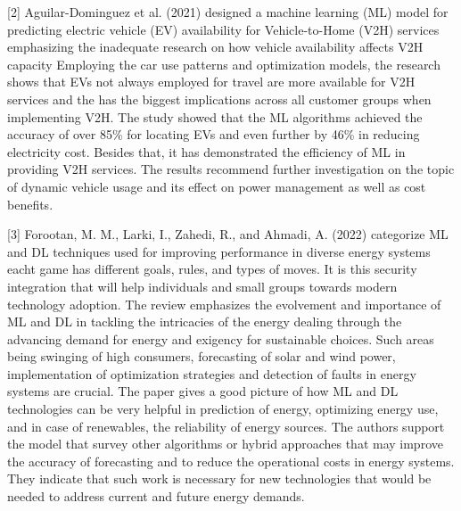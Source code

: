 \documentclass[conference]{IEEEtran}
\begin{document}
[2] Aguilar-Dominguez et al. (2021) designed a machine learning (ML) model for predicting electric vehicle (EV) availability for Vehicle-to-Home (V2H) services emphasizing the inadequate research on how vehicle availability affects V2H capacity Employing the car use patterns and optimization models, the research shows that EVs not always employed for travel are more available for V2H services and the has the biggest implications across all customer groups when implementing V2H. The study showed that the ML algorithms achieved the accuracy of over 85\% for locating EVs and even further by 46\% in reducing electricity cost. Besides that, it has demonstrated the efficiency of ML in providing V2H services. The results recommend further investigation on the topic of dynamic vehicle usage and its effect on power management as well as cost benefits.

[3] Forootan, M. M., Larki, I., Zahedi, R., and Ahmadi, A. (2022) categorize ML and DL techniques used for improving performance in diverse energy systems eacht game has different goals, rules, and types of moves. It is this security integration that will help individuals and small groups towards modern technology adoption. The review emphasizes the evolvement and importance of ML and DL in tackling the intricacies of the energy dealing through the advancing demand for energy and exigency for sustainable choices. Such areas being swinging of high consumers, forecasting of solar and wind power, implementation of optimization strategies and detection of faults in energy systems are crucial. The paper gives a good picture of how ML and DL technologies can be very helpful in prediction of energy, optimizing energy use, and in case of renewables, the reliability of energy sources. The authors support the model that survey other algorithms or hybrid approaches that may improve the accuracy of forecasting and to reduce the operational costs in energy systems. They indicate that such work is necessary for new technologies that would be needed to address current and future energy demands.
\end{document}
